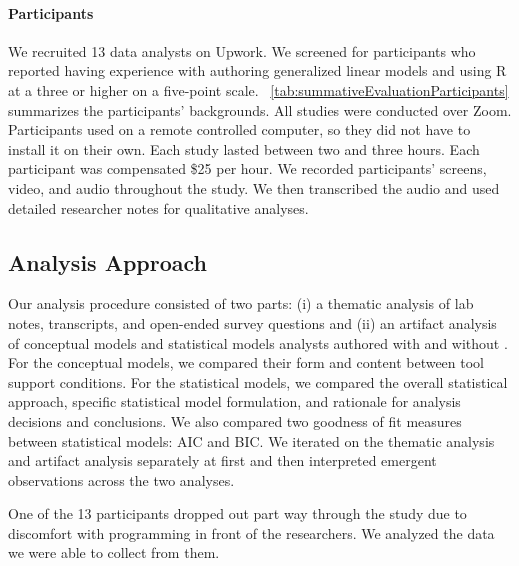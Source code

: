 \noindent \paragraph{Participants} We recruited 13 data analysts on Upwork. We
screened for participants who reported having experience with authoring
generalized linear models and using R at a three or higher on a five-point
scale. ~\autoref{tab:summativeEvaluationParticipants} summarizes the
participants' backgrounds. All studies were conducted over Zoom. Participants used \rTisane
on a remote controlled computer, so they did not have to install it on their
own. Each study lasted between two and three hours. Each participant was compensated
\$25 per hour. We recorded participants' screens, video, and audio throughout
the study. We then transcribed the audio and used detailed researcher notes for
qualitative analyses.

\tableSummativeEvalParticipants

\subsection{Analysis Approach}
Our analysis procedure consisted of two parts: (i) a thematic analysis of lab
notes, transcripts, and open-ended survey questions and (ii) an artifact
analysis of conceptual models and statistical models analysts authored with and
without \rTisane. For the conceptual models, we compared their form and content
between tool support conditions. For the statistical models, we compared the
overall statistical approach, specific statistical model formulation, and
rationale for analysis decisions and conclusions. We also compared two goodness
of fit measures between statistical models: AIC and BIC. We iterated on the
thematic analysis and artifact analysis separately at first and then interpreted
emergent observations across the two analyses. 

One of the 13 participants dropped out part way through the study due to
discomfort with programming in front of the researchers. We analyzed the data we
were able to collect from them. 


